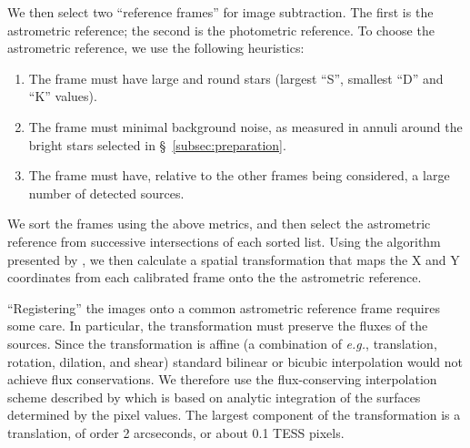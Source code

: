 \documentclass[12pt,twocolumn,tighten]{aastex62}
\begin{document}
We then select two ``reference frames'' for image subtraction.
The first is the astrometric reference; the second is the photometric
reference.
To choose the astrometric reference, we use the following heuristics:
\begin{enumerate}
  \item The frame must have large and round stars (largest ``S'',
    smallest ``D'' and ``K'' values).
  \item The frame must minimal background noise, as measured in annuli
    around the bright stars selected in \S~\ref{subsec:preparation}.
  \item The frame must have, relative to the other frames being
    considered, a large number of detected sources.
\end{enumerate}
We sort the frames using the above metrics, and then select the
astrometric reference from successive intersections of each sorted
list.
Using the algorithm presented by \citet{pal_astrometry_2006}, we then
calculate a spatial transformation that maps the X and Y coordinates
from each calibrated frame onto the the astrometric reference.

``Registering'' the images onto a common astrometric reference frame
requires some care. In particular, the transformation must preserve
the fluxes of the sources. Since the transformation is affine (a
combination of {\it e.g.}, translation, rotation, dilation, and shear)
standard bilinear or bicubic interpolation would not achieve flux
conservations.  We therefore use the flux-conserving interpolation
scheme described by \citet{Pal_2009} which is based on analytic
integration of the surfaces determined by the pixel values. 
The largest component of the transformation is a translation, of order
2 arcseconds, or about 0.1 TESS pixels.
\end{document}
